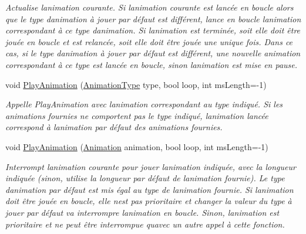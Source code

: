 \begin{DoxyCompactItemize}
\begin{DoxyCompactList}\small\item\em Actualise l\textquotesingle{}animation courante. Si l\textquotesingle{}animation courante est lancée en boucle alors que le type d\textquotesingle{}animation à jouer par défaut est différent, lance en boucle l\textquotesingle{}animation correspondant à ce type d\textquotesingle{}animation. Si l\textquotesingle{}animation est terminée, soit elle doit être jouée en boucle et est relancée, soit elle doit être jouée une unique fois. Dans ce cas, si le type d\textquotesingle{}animation à jouer par défaut est différent, une nouvelle animation correspondant à ce type est lancée en boucle, sinon l\textquotesingle{}animation est mise en pause. \end{DoxyCompactList}\item 
void \hyperlink{class_tentacle_slicers_1_1graphics_1_1_animation_handler_acaf5bb3839d75ef2238dab5bc37d70c4}{Play\+Animation} (\hyperlink{namespace_tentacle_slicers_1_1graphics_a9c92bd633d714099730f10897a01950b}{Animation\+Type} type, bool loop, int ms\+Length=-\/1)
\begin{DoxyCompactList}\small\item\em Appelle Play\+Animation avec l\textquotesingle{}animation correspondant au type indiqué. Si les animations fournies ne comportent pas le type indiqué, l\textquotesingle{}animation lancée correspond à l\textquotesingle{}animation par défaut des animations fournies. \end{DoxyCompactList}\item 
void \hyperlink{class_tentacle_slicers_1_1graphics_1_1_animation_handler_a2b4b19e529766c672717b5274c2261cc}{Play\+Animation} (\hyperlink{class_tentacle_slicers_1_1graphics_1_1_animation}{Animation} animation, bool loop, int ms\+Length=-\/1)
\begin{DoxyCompactList}\small\item\em Interrompt l\textquotesingle{}animation courante pour jouer l\textquotesingle{}animation indiquée, avec la longueur indiquée (sinon, utilise la longueur par défaut de l\textquotesingle{}animation fournie). Le type d\textquotesingle{}animation par défaut est mis égal au type de l\textquotesingle{}animation fournie. Si l\textquotesingle{}animation doit être jouée en boucle, elle n\textquotesingle{}est pas prioritaire et changer la valeur du type à jouer par défaut va interrompre l\textquotesingle{}animation en boucle. Sinon, l\textquotesingle{}animation est prioritaire et ne peut être interrompue qu\textquotesingle{}avec un autre appel à cette fonction. \end{DoxyCompactList}\item 

\end{DoxyCompactItemize}
